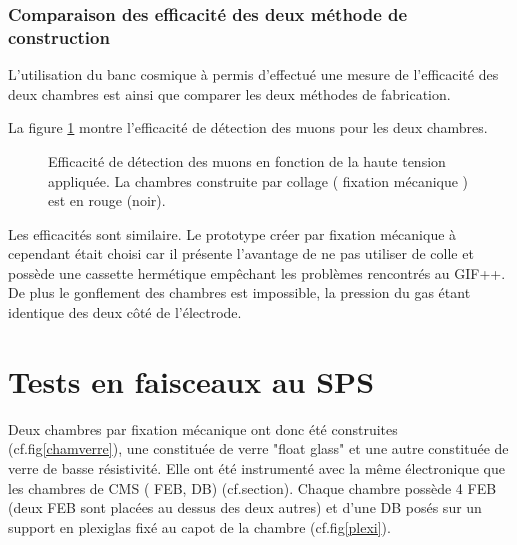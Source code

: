  \subsubsection{Comparaison des efficacité des deux méthode de construction}
L'utilisation du banc cosmique à permis d'effectué une mesure de l'efficacité des deux chambres est ainsi que comparer les deux méthodes de fabrication.

La figure \ref{comparaison2} montre l'efficacité de détection des muons pour les deux chambres.

\begin{figure}[!ht]
	\centering
	\scalebox{1.3}{}
	\caption{Efficacité de détection des muons en fonction de la haute tension appliquée. La chambres construite par collage ( fixation mécanique ) est en rouge (noir).}
	\label{comparaison2}
\end{figure}

Les efficacités sont similaire. Le prototype créer par fixation mécanique à cependant était choisi car il présente l'avantage de ne pas utiliser de colle et possède une cassette hermétique empêchant les problèmes rencontrés au GIF++. De plus le gonflement des chambres est impossible, la pression du gas étant identique des deux côté de l'électrode.

\section{Tests en faisceaux au SPS}
Deux chambres par fixation mécanique ont donc été construites (cf.fig\ref{chamverre}), une constituée de verre "float glass" et une autre constituée de verre de basse résistivité. Elle ont été instrumenté avec la même électronique que les chambres de CMS ( FEB, DB) (cf.section\label{cmselec}). Chaque chambre possède \num{4} FEB (deux FEB sont placées au dessus des deux autres) et d'une DB posés sur un support en plexiglas fixé au capot de la chambre (cf.fig\ref{plexi}).

